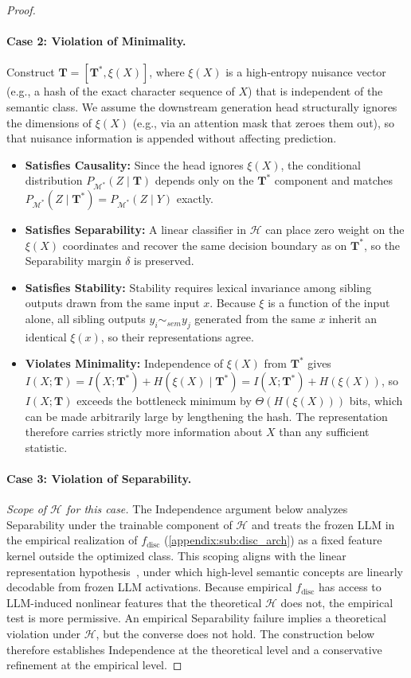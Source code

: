 \begin{proof}
\paragraph{Case 2: Violation of Minimality.}
Construct $\mathbf{T} = [\mathbf{T}^*, \xi(X)]$, where $\xi(X)$ is a high-entropy nuisance vector (e.g., a hash of the exact character sequence of $X$) that is independent of the semantic class. We assume the downstream generation head structurally ignores the dimensions of $\xi(X)$ (e.g., via an attention mask that zeroes them out), so that nuisance information is appended without affecting prediction.
\begin{itemize}
    \item \textbf{Satisfies Causality:} Since the head ignores $\xi(X)$, the conditional distribution $P_{\mathcal{M}^*}(Z \mid \mathbf{T})$ depends only on the $\mathbf{T}^*$ component and matches $P_{\mathcal{M}^*}(Z \mid \mathbf{T}^*) = P_{\mathcal{M}^*}(Z \mid Y)$ exactly.
    \item \textbf{Satisfies Separability:} A linear classifier in $\mathcal{H}$ can place zero weight on the $\xi(X)$ coordinates and recover the same decision boundary as on $\mathbf{T}^*$, so the Separability margin $\delta$ is preserved.
    \item \textbf{Satisfies Stability:} Stability requires lexical invariance among sibling outputs drawn from the same input $x$. Because $\xi$ is a function of the input alone, all sibling outputs $y_i \sim_{sem} y_j$ generated from the same $x$ inherit an identical $\xi(x)$, so their representations agree.
    \item \textbf{Violates Minimality:} Independence of $\xi(X)$ from $\mathbf{T}^*$ gives $I(X; \mathbf{T}) = I(X; \mathbf{T}^*) + H(\xi(X) \mid \mathbf{T}^*) = I(X; \mathbf{T}^*) + H(\xi(X))$, so $I(X; \mathbf{T})$ exceeds the bottleneck minimum by $\Theta(H(\xi(X)))$ bits, which can be made arbitrarily large by lengthening the hash. The representation therefore carries strictly more information about $X$ than any sufficient statistic.
\end{itemize}

\paragraph{Case 3: Violation of Separability.}
\emph{Scope of $\mathcal{H}$ for this case.} The Independence argument below analyzes Separability under the trainable component of $\mathcal{H}$ and treats the frozen LLM in the empirical realization of $f_\mathrm{disc}$ (\cref{appendix:sub:disc_arch}) as a fixed feature kernel outside the optimized class. This scoping aligns with the linear representation hypothesis~\citep{park2024linear}, under which high-level semantic concepts are linearly decodable from frozen LLM activations. Because empirical $f_\mathrm{disc}$ has access to LLM-induced nonlinear features that the theoretical $\mathcal{H}$ does not, the empirical test is more permissive. An empirical Separability failure implies a theoretical violation under $\mathcal{H}$, but the converse does not hold. The construction below therefore establishes Independence at the theoretical level and a conservative refinement at the empirical level.


\end{proof}
